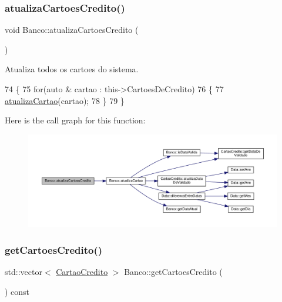 \subsubsection{\texorpdfstring{atualiza\+Cartoes\+Credito()}{atualizaCartoesCredito()}}
{\footnotesize\ttfamily void Banco\+::atualiza\+Cartoes\+Credito (\begin{DoxyParamCaption}{ }\end{DoxyParamCaption})}



Atualiza todos os cartoes do sistema. 


\begin{DoxyCode}
74 \{
75     \textcolor{keywordflow}{for}(\textcolor{keyword}{auto} & cartao : this->CartoesDeCredito)
76     \{
77         \hyperlink{classBanco_a8c8f743903ba86129b62afbb3813e6f0}{atualizaCartao}(cartao);
78     \}
79 \}
\end{DoxyCode}
Here is the call graph for this function\+:
\nopagebreak
\begin{figure}[H]
\begin{center}
\leavevmode
\includegraphics[width=350pt]{classBanco_ad6f39d091c83361878bc5cfda534a49d_cgraph}
\end{center}
\end{figure}
\mbox{\label{classBanco_a859463228f6bf63d32d70afe8efd9541}} 
\subsubsection{\texorpdfstring{get\+Cartoes\+Credito()}{getCartoesCredito()}}
{\footnotesize\ttfamily std\+::vector$<$ \hyperlink{classCartaoCredito}{Cartao\+Credito} $>$ Banco\+::get\+Cartoes\+Credito (\begin{DoxyParamCaption}{ }\end{DoxyParamCaption}) const}



